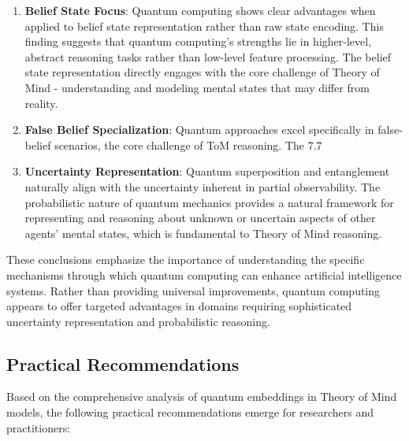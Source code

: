 \documentclass[11pt]{article}
\begin{document}
\begin{enumerate}
    \item \textbf{Belief State Focus}: Quantum computing shows clear advantages when applied to belief state representation rather than raw state encoding. This finding suggests that quantum computing's strengths lie in higher-level, abstract reasoning tasks rather than low-level feature processing. The belief state representation directly engages with the core challenge of Theory of Mind - understanding and modeling mental states that may differ from reality.
    \item \textbf{False Belief Specialization}: Quantum approaches excel specifically in false-belief scenarios, the core challenge of ToM reasoning. The 7.7%
    \item \textbf{Uncertainty Representation}: Quantum superposition and entanglement naturally align with the uncertainty inherent in partial observability. The probabilistic nature of quantum mechanics provides a natural framework for representing and reasoning about unknown or uncertain aspects of other agents' mental states, which is fundamental to Theory of Mind reasoning.
\end{enumerate}

These conclusions emphasize the importance of understanding the specific mechanisms through which quantum computing can enhance artificial intelligence systems. Rather than providing universal improvements, quantum computing appears to offer targeted advantages in domains requiring sophisticated uncertainty representation and probabilistic reasoning.

\subsection{Practical Recommendations}

Based on the comprehensive analysis of quantum embeddings in Theory of Mind models, the following practical recommendations emerge for researchers and practitioners:
\end{document}
